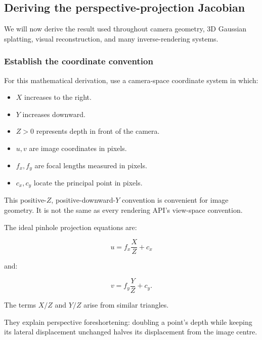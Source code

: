 \subsection{Deriving the perspective-projection Jacobian}\label{02-foundations-ii-ch021-deriving-the-perspective-projection-jacobian}

\hypertarget{02-foundations-ii-ch021-deriving-the-perspective-projection-jacobian}{}

We will now derive the result used throughout camera geometry, 3D Gaussian splatting, visual reconstruction, and many inverse-rendering systems.

\subsubsection{Establish the coordinate convention}\label{02-foundations-ii-ch021-establish-the-coordinate-convention}

\hypertarget{02-foundations-ii-ch021-establish-the-coordinate-convention}{}

For this mathematical derivation, use a camera-space coordinate system in which:

\begin{itemize}
\tightlist
\item
  \(X\) increases to the right.
\item
  \(Y\) increases downward.
\item
  \(Z>0\) represents depth in front of the camera.
\item
  \(u,v\) are image coordinates in pixels.
\item
  \(f_x,f_y\) are focal lengths measured in pixels.
\item
  \(c_x,c_y\) locate the principal point in pixels.
\end{itemize}

This positive-\(Z\), positive-downward-\(Y\) convention is convenient for image geometry. It is not the same as every rendering API's view-space convention.

The ideal pinhole projection equations are:

\[
\boxed{ u=f_x\frac XZ+c_x }
\]

and:

\[
\boxed{ v=f_y\frac YZ+c_y }.
\]

The terms \(X/Z\) and \(Y/Z\) arise from similar triangles.

They explain perspective foreshortening: doubling a point's depth while keeping its lateral displacement unchanged halves its displacement from the image centre.

